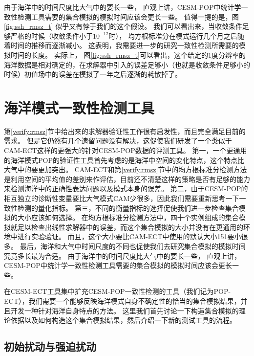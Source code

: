 由于海洋中的时间尺度比大气中的要长一些， 直观上讲，CESM-POP中统计学一致性检测工具需要的集合模拟的模拟时间应该会更长一些。 
值得一提的是，图\ref{fig:ssh_rmsz_t} 似乎又有悖于我们的这个假设。 
我们可以看出来，当收敛条件足够严格的时候（收敛条件小于$10^{-12}$时）， 均方根标准分在模式运行几个月之后随着时间的推移而逐渐减小。
这表明，我需要进一步的研究一致性检测所需要的模拟时间的长度。 
实际上， 图\ref{fig:ssh_rmsz_t}可以看出，这个给定的1度分辨率的海洋数据是相对确定的，在求解器中引入的误差足够小（也就是收敛条件足够小的时候）初值场中的误差在模拟了一年之后逐渐的耗散掉了。



\section{海洋模式一致性检测工具}\label{verify:ECT}


第\ref{verify:rmsz}节中给出来的求解器验证性工作很有启发性，而且完全满足目前的需求。 
但是它仍然有几个遗留问题没有解决，这促使我们研发了一个类似于CAM-ECT这样的更强大的针对CESM-POP数据的评测工具。 
第一，一个更通用的海洋模式POP的验证性工具首先考虑的是海洋中空间的变化特点，这个特点比大气中的要更加突出。
CAM-ECT和第\ref{verify:rmsz}节中的均方根标准分检测方法是利用空间的平均值的差别来作评估，目前还不清楚这样的策略是否有足够的能力来检测海洋中的正确性表达问题以及模式本身的误差。
第二，由于CESM-POP的相互独立的诊断性变量要比大气模式CAM少很多，因此我们需要重新思考一下一致性检测的量化指标。
第三，不同的衡量指标的选择促使我们进一步检查集合模拟的大小应该如何选择。
在均方根标准分检测方法中，四十个实例组成的集合模拟就足以检查出线性求解器中的误差，而这个集合模拟的大小并没有在更通用的环境中进行实验验证。
而且，这个大小要比CAM-ECT中使用的默认大小151要小很多。
最后，海洋和大气中时间尺度的不同也促使我们去研究集合模拟的模拟时间究竟多长最为合适。 
由于海洋中的时间尺度比大气中的要长一些， 直观上讲，CESM-POP中统计学一致性检测工具需要的集合模拟的模拟时间应该会更长一些。 
 
在CESM-ECT工具集中扩充CESM-POP一致性检测的工具（我们记为POP-ECT），我们需要一个能够反映海洋模式自身不确定性的恰当的集合模拟结果，并且开发一种针对海洋自身特点的方法。
这里我们首先讨论一下构造集合模拟的理论依据以及如何构造这个集合模拟结果，然后介绍一下新的测试工具的流程。 


\subsection{初始扰动与强迫扰动}\label{verify:pertub}

